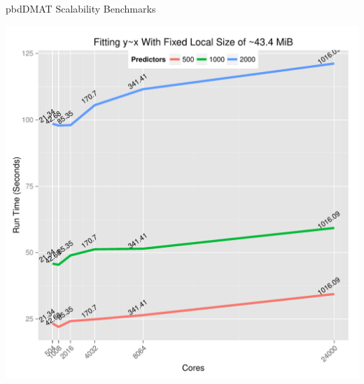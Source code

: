 \begin{frame}[fragile]
\begin{block}{pbdDMAT Scalability Benchmarks}
\begin{minipage}{0.55\textwidth}
\begin{center}
        \includegraphics[trim=3mm 1mm 2mm
        12mm,clip,width=.98\textwidth]{../common/pics/benchmarks/lmfit2}
      \end{center}
    \end{minipage}
  \end{block}
\end{frame}

